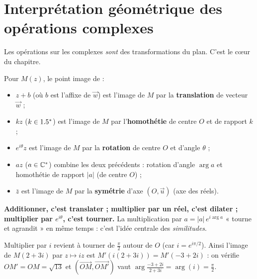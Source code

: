 \section{Interprétation géométrique des opérations complexes}

Les opérations sur les complexes \emph{sont} des transformations du plan. C'est le c\oe ur du chapitre.

\begin{propriete}
Pour $M(z)$, le point image de :
\begin{itemize}
\item $z+b$ (où $b$ est l'affixe de $\vec w$) est l'image de $M$ par la \textbf{translation} de vecteur $\vec w$ ;
\item $kz$ ($k\in1.5^*$) est l'image de $M$ par l'\textbf{homothétie} de centre $O$ et de rapport $k$ ;
\item $e^{i\theta}z$ est l'image de $M$ par la \textbf{rotation} de centre $O$ et d'angle $\theta$ ;
\item $az$ ($a\in\mathbb{C}^*$) combine les deux précédents : rotation d'angle $\arg a$ et homothétie de rapport $|a|$ (de centre $O$) ;
\item $\bar z$ est l'image de $M$ par la \textbf{symétrie} d'axe $(O,\vec u)$ (axe des réels).
\end{itemize}
\end{propriete}

\begin{remarque}
\textbf{Additionner, c'est translater ; multiplier par un réel, c'est dilater ; multiplier par
$e^{i\theta}$, c'est tourner.} La multiplication par $a=|a|\,e^{i\arg a}$ « tourne et agrandit »
en même temps : c'est l'idée centrale des \emph{similitudes}.
\end{remarque}

\begin{exemple}
Multiplier par $i$ revient à tourner de $\frac\pi2$ autour de $O$ (car $i=e^{i\pi/2}$). Ainsi l'image
de $M(2+3i)$ par $z\mapsto iz$ est $M'(i(2+3i))=M'(-3+2i)$ : on vérifie $OM'=OM=\sqrt{13}$ et
$(\overrightarrow{OM},\overrightarrow{OM'})$ vaut $\arg\frac{-3+2i}{2+3i}=\arg(i)=\frac\pi2$.
\end{exemple}

